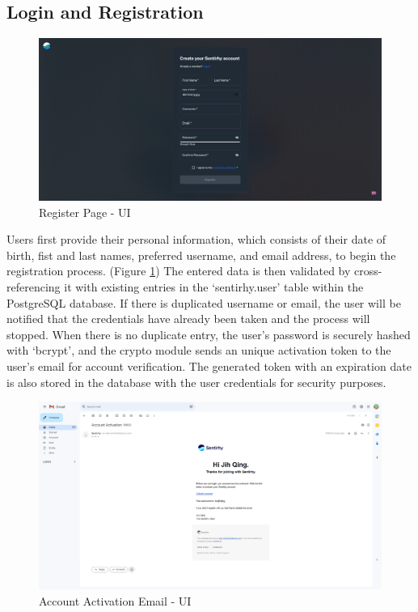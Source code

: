 \subsection{Login and Registration}
\begin{figure}[h!]
    \centering
    \includegraphics[width=14cm]{Images/register-ui.png}
    \caption{Register Page - UI}
    \label{fig:register-page-ui}
\end{figure}
Users first provide their personal information, which consists of their date of birth, fist and last names, preferred username, and email address, to begin the registration process. (Figure \ref{fig:register-page-ui}) 
The entered data is then validated by cross-referencing it with existing entries in the `sentirhy.user' table within the PostgreSQL database.
If there is duplicated username or email, the user will be notified that the credentials have already been taken and the process will stopped.
When there is no duplicate entry, the user's password is securely hashed with `bcrypt', and the crypto module sends an unique activation token to the user's email for account verification.
The generated token with an expiration date is also stored in the database with the user credentials for security purposes. 
\\
\begin{figure}[h!]
    \centering
    \includegraphics[width=14cm]{Images/acc-activation.png}
    \caption{Account Activation Email - UI}
    \label{fig:account-activation-ui}
\end{figure}
